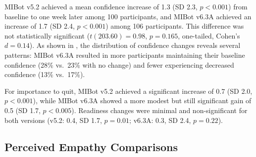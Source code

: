 MIBot v5.2 achieved a mean confidence increase of 1.3 (SD 2.3, $p < 0.001$)
from baseline to one week later among 100 participants, and
MIBot v6.3A achieved an increase of 1.7 (SD 2.4, $p < 0.001$) among 106 participants.
This difference was not statistically significant ($t(203.60) = 0.98$,
$p = 0.165$, one-tailed, Cohen's $d = 0.14$). As shown in ,
the distribution of confidence changes reveals several patterns: MIBot v6.3A
resulted in more participants maintaining their baseline confidence (28\% vs.\ 23\%
with no change) and fewer experiencing decreased confidence (13\% vs.\ 17\%).

For importance to quit, MIBot v5.2 achieved a significant increase of 0.7 (SD 2.0, $p < 0.001$), while MIBot v6.3A showed a more modest but still significant gain of 0.5 (SD 1.7, $p < 0.005$). Readiness changes were minimal and non-significant for both versions (v5.2: 0.4, SD 1.7, $p = 0.01$; v6.3A: 0.3, SD 2.4, $p = 0.22$).

\subsection*{Perceived Empathy Comparisons}


